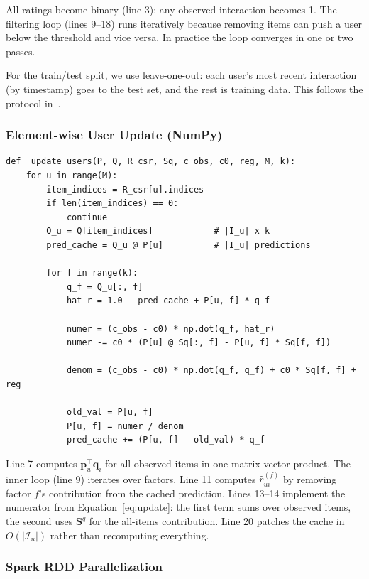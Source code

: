 \documentclass[11pt,a4paper]{article}
\begin{document}
All ratings become binary (line 3): any observed interaction becomes 1. The filtering loop (lines 9--18) runs iteratively because removing items can push a user below the threshold and vice versa. In practice the loop converges in one or two passes.

For the train/test split, we use leave-one-out: each user's most recent interaction (by timestamp) goes to the test set, and the rest is training data. This follows the protocol in~\cite{he2016}.

\subsubsection{Element-wise User Update (NumPy)}

\begin{lstlisting}[caption={Core element-wise update for user factors.}]
def _update_users(P, Q, R_csr, Sq, c_obs, c0, reg, M, k):
    for u in range(M):
        item_indices = R_csr[u].indices
        if len(item_indices) == 0:
            continue
        Q_u = Q[item_indices]            # |I_u| x k
        pred_cache = Q_u @ P[u]          # |I_u| predictions

        for f in range(k):
            q_f = Q_u[:, f]
            hat_r = 1.0 - pred_cache + P[u, f] * q_f

            numer = (c_obs - c0) * np.dot(q_f, hat_r)
            numer -= c0 * (P[u] @ Sq[:, f] - P[u, f] * Sq[f, f])

            denom = (c_obs - c0) * np.dot(q_f, q_f) + c0 * Sq[f, f] + reg

            old_val = P[u, f]
            P[u, f] = numer / denom
            pred_cache += (P[u, f] - old_val) * q_f
\end{lstlisting}

Line 7 computes $\mathbf{p}_u^\top \mathbf{q}_i$ for all observed items in one matrix-vector product. The inner loop (line 9) iterates over factors. Line 11 computes $\hat{r}_{ui}^{(f)}$ by removing factor $f$'s contribution from the cached prediction. Lines 13--14 implement the numerator from Equation~\ref{eq:update}: the first term sums over observed items, the second uses $\mathbf{S}^q$ for the all-items contribution. Line 20 patches the cache in $O(|\mathcal{I}_u|)$ rather than recomputing everything.

\subsubsection{Spark RDD Parallelization}
\end{document}
